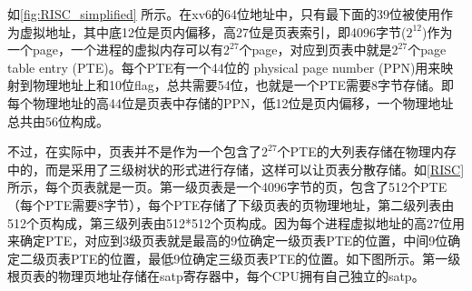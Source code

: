 如\cref{fig:RISC_simplified} 所示。在xv6的64位地址中，只有最下面的39位被使用作为虚拟地址，其中底12位是页内偏移，高27位是页表索引，即4096字节($2^{12}$)作为一个page，一个进程的虚拟内存可以有$2^{27}$个page，对应到页表中就是$2^{27}$个page table entry (PTE)。每个PTE有一个44位的 physical page number (PPN)用来映射到物理地址上和10位flag，总共需要54位，也就是一个PTE需要8字节存储。即每个物理地址的高44位是页表中存储的PPN，低12位是页内偏移，一个物理地址总共由56位构成。

不过，在实际中，页表并不是作为一个包含了$2^{27}$个PTE的大列表存储在物理内存中的，而是采用了三级树状的形式进行存储，这样可以让页表分散存储。如\cref{RISC}所示，每个页表就是一页。第一级页表是一个4096字节的页，包含了512个PTE（每个PTE需要8字节），每个PTE存储了下级页表的页物理地址，第二级列表由512个页构成，第三级列表由512*512个页构成。因为每个进程虚拟地址的高27位用来确定PTE，对应到3级页表就是最高的9位确定一级页表PTE的位置，中间9位确定二级页表PTE的位置，最低9位确定三级页表PTE的位置。如下图所示。第一级根页表的物理页地址存储在satp寄存器中，每个CPU拥有自己独立的satp。


